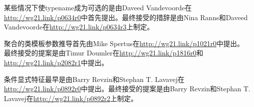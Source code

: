 某些情况下使typename成为可选的是由Daveed Vandevoorde在\url{http://wg21.link/p0634r0}中首先提出。最终接受的措辞是由Nina Ranns和Daveed Vandevoorde在\url{http://wg21.link/p0634r3}上制定。

聚合的类模板参数推导首先由Mike Spertus在\url{http://wg21.link/p1021r0}中提出。最终接受的提案是由Timur Doumler在\url{http://wg21.link/p1816r0}和\url{http://wg21.link/p2082r1}中提出。

条件显式特征最早是由Barry Revzin和Stephan T. Lavavej在\url{http://wg21.link/p0892r0}中提出。最终接受的提案是由Barry Revzin和Stephan T. Lavavej在\url{http://wg21.link/p0892r2}上制定。